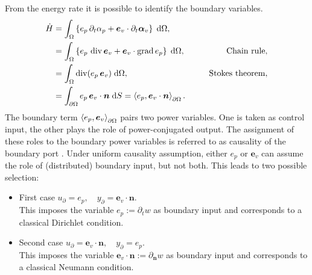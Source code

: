 From the energy rate it is possible to identify the boundary variables. 
\begin{align*}
\dot{H} &= \int_{\Omega} \left\{ e_p \, \partial_t \alpha_p + \bm{e}_v \cdot \partial_t \bm{\alpha}_v\right\} \d\Omega, \\
 &= \int_{\Omega} \left\{e_p \, \div \bm{e}_v + \bm{e}_v \cdot \grad e_p \right\}\d\Omega, \qquad &\text{Chain rule}, \\
 &= \int_{\Omega} \div(e_p \, \bm{e}_v) \d\Omega, \qquad &\text{Stokes theorem}, \\
 &= \int_{\partial \Omega} e_p \, \bm{e}_v\cdot\bm{n} \d{S} = \inner[\partial\Omega]{e_p}{\bm{e}_v \cdot\bm{n}}.
\end{align*}
The boundary term $\inner[\partial\Omega]{e_p}{\bm{e}_v}$ pairs two power variables. One is taken as control input, the other plays the role of power-conjugated output. The assignment of these roles to the boundary power variables is referred to as causality of the boundary port \cite[Chapter~2]{kotyczka2019numerical}. Under uniform causality assumption, either $e_p$ or $\bm{e}_v$ can assume the role of (distributed) boundary input, but not both. This leads to two possible selection:
\begin{itemize}
	\item {First case} ${u}_\partial = e_p, \quad {y}_\partial = \bm{e}_v \cdot\bm{n}$. \\
	This imposes the variable $e_p:= \partial_t w$ as boundary input and corresponds to a classical Dirichlet condition.
	
	\item {Second case} ${u}_\partial = \bm{e}_v \cdot\bm{n}, \quad {y}_\partial = e_p$. \\
	This imposes the variable $\bm{e}_v \cdot\bm{n}:= \partial_{\bm{n}} w$ as boundary input and corresponds to a classical Neumann condition.
\end{itemize} 


